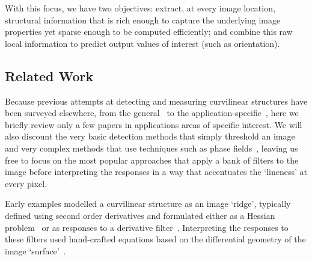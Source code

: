 \documentclass{IEEEtran}
\def\dtcwt{DT-$\mathbb{C}$WT}
\newcommand{\comment}[1]{}
\begin{document}

With this focus, we have two objectives: extract, at every image location, structural information that is rich enough to capture the underlying image properties yet sparse enough to be computed efficiently; and combine this raw local information to predict output values of interest (such as orientation).


\subsection{Related Work}
\comment{
There is no 3D analogue of the \dtcwt{}. Therefore, we should avoid 3D datasets and related work as much as possible - this paper is solely about the analysis of 2D image structures. This includes aerial photography, retinal images, fingerprints and palmprints, surface inspection, and possibly fibre analysis.
}

Because previous attempts at detecting and measuring curvilinear structures have been surveyed elsewhere, from the general~\cite{Papari_Petkov_IVC11} to the application-specific~\cite{Kirbas_Quek_ACMCS04,Lesage_etal_MIA09}, here we briefly review only a few papers in applications areas of specific interest. We will also discount the very basic detection methods that simply threshold an image~\cite{Jiang_Mojon_TPAMI03} and very complex methods that use techniques such as phase fields~\cite{Peng_etal_IJCV09}, leaving us free to focus on the most popular approaches that apply a bank of filters to the image before interpreting the responses in a way that accentuates the `lineness' at every pixel.

Early examples modelled a curvilinear structure as an image `ridge', typically defined using second order derivatives and formulated either as a Hessian problem~\cite{Frangi_etal_MICCAI98,Sato_etal_MIA98} or as responses to a derivative filter~\cite{Staal_etal_TMI04,Aylward_Bullitt_TMI02,Steger_TPAMI98,Koenderink_vanDoorn_TPAMI92}. Interpreting the responses to these filters used hand-crafted equations based on the differential geometry of the image `surface'~\cite{Frangi_etal_MICCAI98,Sato_etal_MIA98}.
\end{document}
